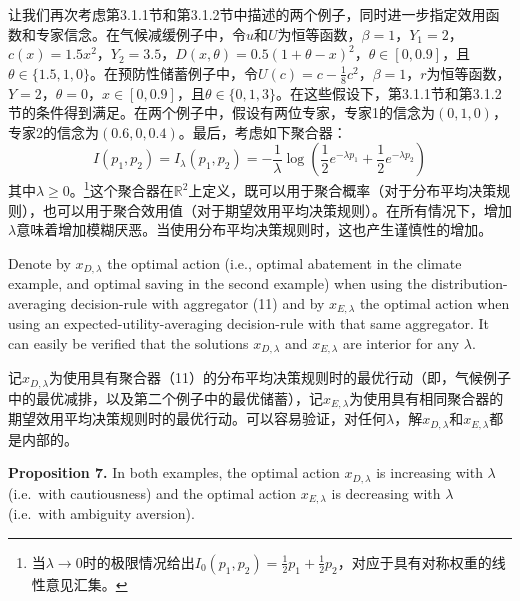 \documentclass[12pt,a4paper]{article}
\newenvironment{original}
  {\par\noindent\ignorespaces}
  {\par}
\newenvironment{translation}
  {\par\noindent{\color{transblue}\ignorespaces}}
  {\par\medskip}
\newcommand{\R}{\mathbb{R}}
\begin{document}
\begin{translation}
让我们再次考虑第3.1.1节和第3.1.2节中描述的两个例子，同时进一步指定效用函数和专家信念。在气候减缓例子中，令$u$和$U$为恒等函数，$\beta = 1$，$Y_{1} = 2$，$c(x) = 1.5x^{2}$，$Y_{2} = 3.5$，$D(x, \theta) = 0.5(1 + \theta - x)^{2}$，$\theta \in [0, 0.9]$，且$\theta \in \{1.5, 1, 0\}$。在预防性储蓄例子中，令$U(c) = c - \frac{1}{8}c^{2}$，$\beta = 1$，$r$为恒等函数，$Y = 2$，$\theta = 0$，$x \in [0, 0.9]$，且$\theta \in \{0, 1, 3\}$。在这些假设下，第3.1.1节和第3.1.2节的条件得到满足。在两个例子中，假设有两位专家，专家1的信念为$(0, 1, 0)$，专家2的信念为$(0.6, 0, 0.4)$。最后，考虑如下聚合器：
\[
I(p_{1}, p_{2}) = I_{\lambda}(p_{1}, p_{2}) = -\frac{1}{\lambda} \log\!\left( \frac{1}{2} e^{-\lambda p_{1}} + \frac{1}{2} e^{-\lambda p_{2}} \right) \tag{11}
\]
其中$\lambda \geq 0$。\footnote{当$\lambda \to 0$时的极限情况给出$I_{0}(p_{1}, p_{2}) = \frac{1}{2}p_{1} + \frac{1}{2}p_{2}$，对应于具有对称权重的线性意见汇集。}这个聚合器在$\R^{2}$上定义，既可以用于聚合概率（对于分布平均决策规则），也可以用于聚合效用值（对于期望效用平均决策规则）。在所有情况下，增加$\lambda$意味着增加模糊厌恶。当使用分布平均决策规则时，这也产生谨慎性的增加。
\end{translation}

\begin{original}
Denote by $x_{D,\lambda}$ the optimal action (i.e., optimal abatement in the climate example, and optimal saving in the second example) when using the distribution-averaging decision-rule with aggregator (11) and by $x_{E,\lambda}$ the optimal action when using an expected-utility-averaging decision-rule with that same aggregator. It can easily be verified that the solutions $x_{D,\lambda}$ and $x_{E,\lambda}$ are interior for any $\lambda$.
\end{original}

\begin{translation}
记$x_{D,\lambda}$为使用具有聚合器（11）的分布平均决策规则时的最优行动（即，气候例子中的最优减排，以及第二个例子中的最优储蓄），记$x_{E,\lambda}$为使用具有相同聚合器的期望效用平均决策规则时的最优行动。可以容易验证，对任何$\lambda$，解$x_{D,\lambda}$和$x_{E,\lambda}$都是内部的。
\end{translation}

\begin{original}
\textbf{Proposition 7.} In both examples, the optimal action $x_{D,\lambda}$ is increasing with $\lambda$ (i.e.\ with cautiousness) and the optimal action $x_{E,\lambda}$ is decreasing with $\lambda$ (i.e.\ with ambiguity aversion).
\end{original}
\end{document}
